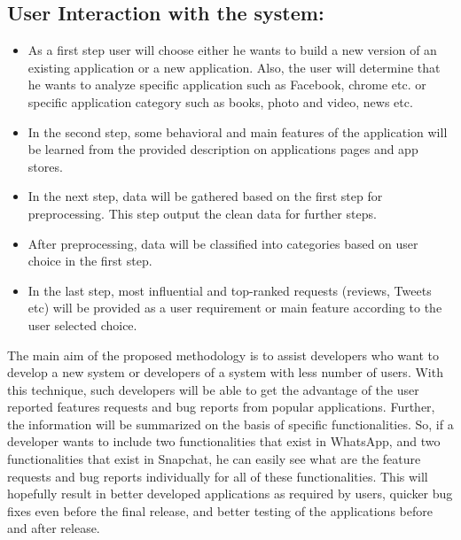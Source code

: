 \subsection{User Interaction with the system:}
\begin{itemize}

\item{As a first step user will choose either he wants to build a new version of an existing application or a new application. Also, the user will determine that he wants to analyze specific application such as Facebook, chrome etc. 
or specific application category such as books, photo and video, news etc.}
\item{In the second step, some behavioral and main features of the application will be learned from the provided description on applications pages and app stores.}
\item{In the next step, data will be gathered based on the first step for preprocessing. This step output the clean data for further steps.}
\item{After preprocessing, data will be classified into categories based on user choice in the first step.}
\item{In the last step, most influential and top-ranked requests (reviews, Tweets etc) will be provided as a user requirement or main feature according to the user selected choice.}

\end{itemize}

	The main aim of the proposed methodology is to assist developers who want to develop a new
system or developers of a system with less number of users. With this technique, such
developers will be able to get the advantage of the user reported features requests and bug reports
from popular applications. Further, the information will be summarized on the basis of specific
functionalities. So, if a developer wants to include two functionalities that exist in WhatsApp,
and two functionalities that exist in Snapchat, he can easily see what are the feature requests
and bug reports individually for all of these functionalities. This will hopefully result in better
developed applications as required by users, quicker bug fixes even before the final release, and
better testing of the applications before and after release.